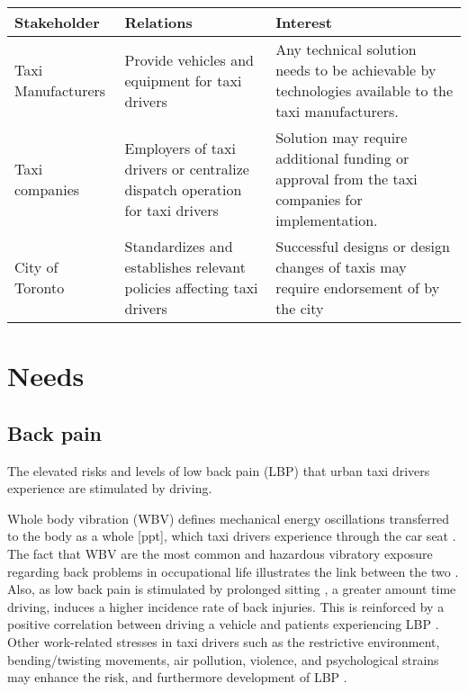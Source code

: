 \documentclass[11pt]{article}
\begin{document}
\begin{center}
    \begin{tabular}{ l p{5cm} p{5cm}}
    Stakeholder & Relations &	Interest \\ \hline
    Taxi Manufacturers & Provide vehicles and equipment for taxi drivers	& 
    Any technical solution needs to be achievable by technologies available 
    to the taxi manufacturers. \\ 
    Taxi companies & Employers of taxi drivers or centralize dispatch 
    operation for taxi drivers	& Solution may require additional funding 
    or approval from the taxi companies for implementation. \\
    City of Toronto & Standardizes and establishes relevant policies 
    affecting taxi drivers \cite{CityofToronto}	& Successful designs or design changes of  
    taxis may require endorsement of by the city  \\
    \end{tabular}
\end{center}

\section{Needs}
\label{sec:needs}
\subsection{Back pain}
The elevated risks and levels of low back pain (LBP) that urban taxi drivers 
experience are stimulated by driving. 

Whole body vibration (WBV) defines mechanical energy oscillations transferred to 
the body as a whole [ppt], which taxi drivers experience \cite{KneePain, Serious} 
through the car seat \cite{ppt}. The fact that WBV are the most common and hazardous 
vibratory exposure regarding back problems in occupational life illustrates the
link between the two \cite{ODrivers@Risk}. Also, as low back pain is stimulated by 
prolonged sitting \cite{Okunribido2008}, a greater amount time driving, induces a 
higher incidence rate of back injuries\cite{Question?}. This is reinforced by a positive 
correlation between driving a vehicle and patients experiencing LBP \cite{ODrivers@Risk}. 
Other work-related stresses in taxi drivers such as the restrictive environment, bending/twisting 
movements, air pollution, violence, and psychological strains may enhance the risk, 
and furthermore development of LBP \cite{KneePain, POSTULATED}. 
\end{document}
